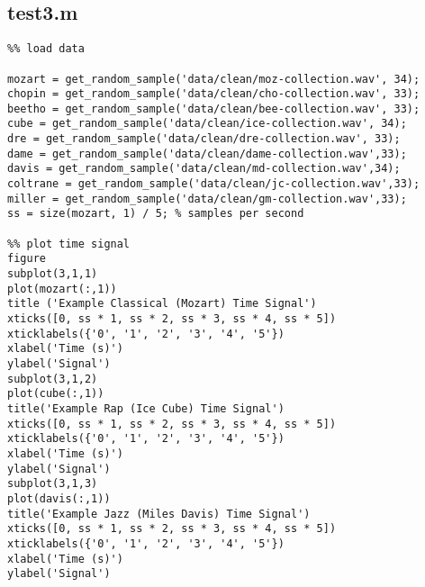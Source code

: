 \documentclass[12pt, a4paper]{article}
\begin{document}
\subsection{test3.m}
\begin{verbatim}
%% load data

mozart = get_random_sample('data/clean/moz-collection.wav', 34);
chopin = get_random_sample('data/clean/cho-collection.wav', 33);
beetho = get_random_sample('data/clean/bee-collection.wav', 33);
cube = get_random_sample('data/clean/ice-collection.wav', 34);
dre = get_random_sample('data/clean/dre-collection.wav', 33);
dame = get_random_sample('data/clean/dame-collection.wav',33);
davis = get_random_sample('data/clean/md-collection.wav',34);
coltrane = get_random_sample('data/clean/jc-collection.wav',33);
miller = get_random_sample('data/clean/gm-collection.wav',33);
ss = size(mozart, 1) / 5; % samples per second

%% plot time signal
figure
subplot(3,1,1)
plot(mozart(:,1))
title ('Example Classical (Mozart) Time Signal')
xticks([0, ss * 1, ss * 2, ss * 3, ss * 4, ss * 5])
xticklabels({'0', '1', '2', '3', '4', '5'})
xlabel('Time (s)')
ylabel('Signal')
subplot(3,1,2)
plot(cube(:,1))
title('Example Rap (Ice Cube) Time Signal')
xticks([0, ss * 1, ss * 2, ss * 3, ss * 4, ss * 5])
xticklabels({'0', '1', '2', '3', '4', '5'})
xlabel('Time (s)')
ylabel('Signal')
subplot(3,1,3)
plot(davis(:,1))
title('Example Jazz (Miles Davis) Time Signal')
xticks([0, ss * 1, ss * 2, ss * 3, ss * 4, ss * 5])
xticklabels({'0', '1', '2', '3', '4', '5'})
xlabel('Time (s)')
ylabel('Signal')


\end{verbatim}
\end{document}
